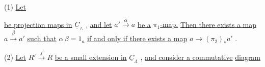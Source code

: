 (1) \underline{Let}    \underline{be projection maps in}  $\underline{C}_{\wedge}$ , \underline{and let}  $a' \xrightarrow{\ \alpha\ } a$
\underline{be a}  \underline{$\pi_1$-map.} \underline{Then there exists a map}  $a \xrightarrow{\ \beta\ } a'$  \underline{such that}  $\alpha\,\beta = 1_a$ \underline{if and only if there exists a map}  $a \longrightarrow (\pi_2)_* a'$  .

(2)  \underline{Let}  $R' \xrightarrow{\ f\ } R$  \underline{be a small extension in}  $\underline{C}_{\Lambda}$  , \underline{and consider a commutative} \underline{diagram}

